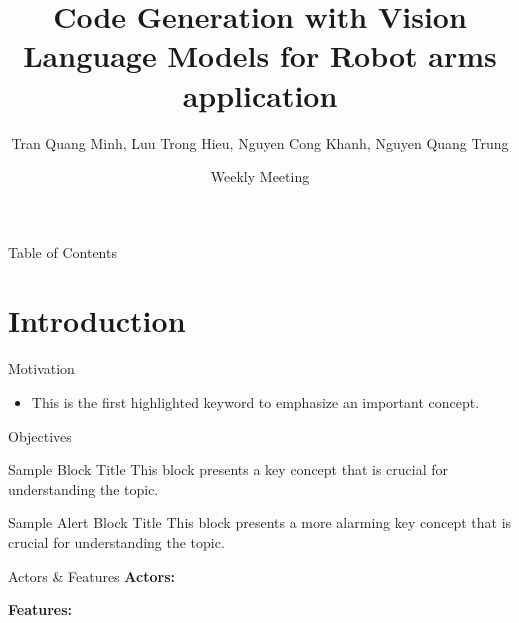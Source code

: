 \documentclass{beamer}
\title{Code Generation with Vision Language Models for Robot arms application}
\author{Tran Quang Minh, Luu Trong Hieu, Nguyen Cong Khanh, Nguyen Quang Trung}
\institute[FPT University - VietDynamic JSC]{
 \textit{Department of Artificial Intelligence} \\
 FPT University - VietDynamic JSC}  %
\date{Weekly Meeting}  %
\begin{document}
\begin{frame}
    \titlepage
    \note{}
\end{frame}

\begin{frame}{Table of Contents}
    \tableofcontents
    \note{}
\end{frame}

\section{Introduction} 

\begin{frame}{Motivation}
    \begin{itemize} 	
        \item This is the first \alert{highlighted keyword} to emphasize an important concept.
    \end{itemize}
    \note{}
\end{frame}

\begin{frame}[label=objectives]{Objectives \hyperlink{scope}{}}
    \begin{block}{Sample Block Title}
        This block presents a \alert{key concept} that is crucial for understanding the topic.
    \end{block}
    \begin{alertblock}{Sample Alert Block Title}
        This block presents a more alarming \alert{key concept} that is crucial for understanding the topic.
    \end{alertblock}
    \note{}
\end{frame}

\begin{frame}{Actors \& Features}
    \textbf{Actors:}
                                    
    \textbf{Features:}
    \note{}
\end{frame}
\end{document}
